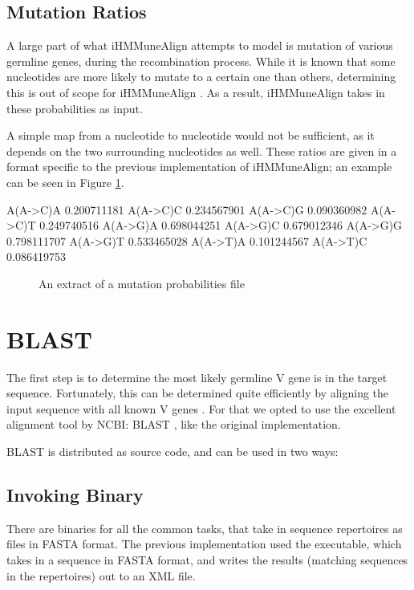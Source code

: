 \subsection{Mutation Ratios}
A large part of what iHMMuneAlign attempts to model is mutation of various germline genes, during the recombination process. While it is known that some nucleotides are more likely to mutate to a certain one than others, determining this is out of scope for iHMMuneAlign \autocite{iHMMuneAlign}. As a result, iHMMuneAlign takes in these probabilities as input.

A simple map from a nucleotide to nucleotide would not be sufficient, as it depends on the two surrounding nucleotides as well. These ratios are given in a format specific to the previous implementation of iHMMuneAlign; an example can be seen in Figure \ref{fig:mutation-probs}.

\begin{verbbox}
A(A->C)A 	0.200711181
A(A->C)C 	0.234567901
A(A->C)G 	0.090360982
A(A->C)T 	0.249740516
A(A->G)A 	0.698044251
A(A->G)C 	0.679012346
A(A->G)G 	0.798111707
A(A->G)T 	0.533465028
A(A->T)A 	0.101244567
A(A->T)C 	0.086419753
\end{verbbox}

\begin{figure}
    \label{fig:mutation-probs}
    \centering
    \theverbbox
    \caption{An extract of a mutation probabilities file}
\end{figure}

\section{BLAST}
The first step is to determine the most likely germline V gene is in the target sequence. Fortunately, this can be determined quite efficiently by aligning the input sequence with all known V genes \cite{iHMMuneAlign}. For that we opted to use the excellent alignment tool by NCBI: BLAST \cite{blast}, like the original implementation.

BLAST is distributed as source code, and can be used in two ways:
\subsection{Invoking Binary}
\label{sec:blast-bin}
There are binaries for all the common tasks, that take in sequence repertoires as files in FASTA \autocite{fasta} format. The previous implementation used the  executable, which takes in a sequence in FASTA format, and writes the results (matching sequences in the repertoires) out to an XML file.

